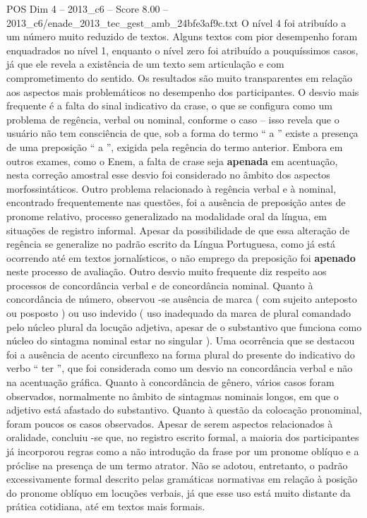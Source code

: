 \begin{textsample}{POS Dim 4 – 2013\_c6 – Score 8.00 – 2013\_c6/enade\_2013\_tec\_gest\_amb\_24bfe3af9c.txt}
O nível 4 foi atribuído a um número muito reduzido de textos.
Alguns textos com pior desempenho foram enquadrados no nível 1, enquanto o nível zero foi atribuído a pouquíssimos casos, já que ele revela a existência de um texto sem articulação e com comprometimento do sentido.
Os resultados são muito transparentes em relação aos aspectos mais problemáticos no desempenho dos participantes.
O desvio mais frequente é a falta do sinal indicativo da crase, o que se configura como um problema de regência, verbal ou nominal, conforme o caso – isso revela que o usuário não tem consciência de que, sob a forma do termo “ a ” existe a presença de uma preposição “ a ”, exigida pela regência do termo anterior.
Embora em outros exames, como o Enem, a falta de crase seja \textbf{apenada} em acentuação, nesta correção amostral esse desvio foi considerado no âmbito dos aspectos morfossintáticos.
Outro problema relacionado à regência verbal e à nominal, encontrado frequentemente nas questões, foi a ausência de preposição antes de pronome relativo, processo generalizado na modalidade oral da língua, em situações de registro informal.
Apesar da possibilidade de que essa alteração de regência se generalize no padrão escrito da Língua Portuguesa, como já está ocorrendo até em textos jornalísticos, o não emprego da preposição foi \textbf{apenado} neste processo de avaliação.
Outro desvio muito frequente diz respeito aos processos de concordância verbal e de concordância nominal.
Quanto à concordância de número, observou -se ausência de marca ( com sujeito anteposto ou posposto ) ou uso indevido ( uso inadequado da marca de plural comandado pelo núcleo plural da locução adjetiva, apesar de o substantivo que funciona como núcleo do sintagma nominal estar no singular ).
Uma ocorrência que se destacou foi a ausência de acento circunflexo na forma plural do presente do indicativo do verbo “ ter ”, que foi considerada como um desvio na concordância verbal e não na acentuação gráfica.
Quanto à concordância de gênero, vários casos foram observados, normalmente no âmbito de sintagmas nominais longos, em que o adjetivo está afastado do substantivo.
Quanto à questão da colocação pronominal, foram poucos os casos observados.
Apesar de serem aspectos relacionados à oralidade, concluiu -se que, no registro escrito formal, a maioria dos participantes já incorporou regras como a não introdução da frase por um pronome oblíquo e a próclise na presença de um termo atrator.
Não se adotou, entretanto, o padrão excessivamente formal descrito pelas gramáticas normativas em relação à posição do pronome oblíquo em locuções verbais, já que esse uso está muito distante da prática cotidiana, até em textos mais formais.

\end{textsample}
